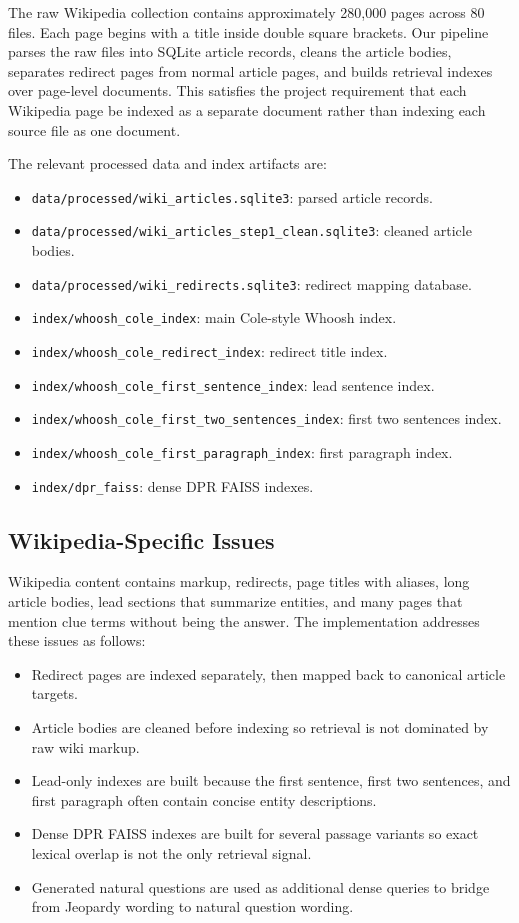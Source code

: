 \documentclass[11pt]{article}
\begin{document}
The raw Wikipedia collection contains approximately 280,000 pages across 80 files. Each page begins with a title inside double square brackets. Our pipeline parses the raw files into SQLite article records, cleans the article bodies, separates redirect pages from normal article pages, and builds retrieval indexes over page-level documents. This satisfies the project requirement that each Wikipedia page be indexed as a separate document rather than indexing each source file as one document.

The relevant processed data and index artifacts are:

\begin{itemize}[leftmargin=*]
  \item \texttt{data/processed/wiki\_articles.sqlite3}: parsed article records.
  \item \texttt{data/processed/wiki\_articles\_step1\_clean.sqlite3}: cleaned article bodies.
  \item \texttt{data/processed/wiki\_redirects.sqlite3}: redirect mapping database.
  \item \texttt{index/whoosh\_cole\_index}: main Cole-style Whoosh index.
  \item \texttt{index/whoosh\_cole\_redirect\_index}: redirect title index.
  \item \texttt{index/whoosh\_cole\_first\_sentence\_index}: lead sentence index.
  \item \texttt{index/whoosh\_cole\_first\_two\_sentences\_index}: first two sentences index.
  \item \texttt{index/whoosh\_cole\_first\_paragraph\_index}: first paragraph index.
  \item \texttt{index/dpr\_faiss}: dense DPR FAISS indexes.
\end{itemize}

\subsection{Wikipedia-Specific Issues}

Wikipedia content contains markup, redirects, page titles with aliases, long article bodies, lead sections that summarize entities, and many pages that mention clue terms without being the answer. The implementation addresses these issues as follows:

\begin{itemize}[leftmargin=*]
  \item Redirect pages are indexed separately, then mapped back to canonical article targets.
  \item Article bodies are cleaned before indexing so retrieval is not dominated by raw wiki markup.
  \item Lead-only indexes are built because the first sentence, first two sentences, and first paragraph often contain concise entity descriptions.
  \item Dense DPR FAISS indexes are built for several passage variants so exact lexical overlap is not the only retrieval signal.
  \item Generated natural questions are used as additional dense queries to bridge from Jeopardy wording to natural question wording.
\end{itemize}
\end{document}
